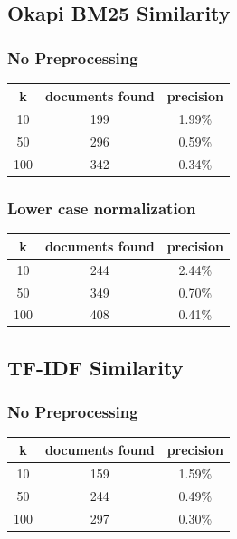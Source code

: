 \documentclass{article}
\begin{document}
\subsection{Okapi BM25 Similarity}
\subsubsection{No Preprocessing}
\begin{center}
\begin{tabular}{|c|c|c|} \hline
\textbf{k} & \textbf{documents found} & \textbf{precision}\\ \hline
10 & 199 & 1.99\%\\
50 & 296 & 0.59\%\\
100 & 342 & 0.34\%\\ \hline
\end{tabular}
\end{center}
\subsubsection{Lower case normalization}

\begin{center}
\begin{tabular}{|c|c|c|} \hline
\textbf{k} & \textbf{documents found} & \textbf{precision}\\ \hline
10 & 244 & 2.44\%\\
50 & 349 & 0.70\%\\
100 & 408 & 0.41\%\\ \hline
\end{tabular}
\end{center}

\subsection{TF-IDF Similarity}
\subsubsection{No Preprocessing}
\begin{center}
\begin{tabular}{|c|c|c|} \hline
\textbf{k} & \textbf{documents found} & \textbf{precision}\\ \hline
10 & 159 & 1.59\%\\
50 & 244 & 0.49\%\\
100 & 297 & 0.30\%\\ \hline

\end{tabular}
\end{center}
\end{document}
